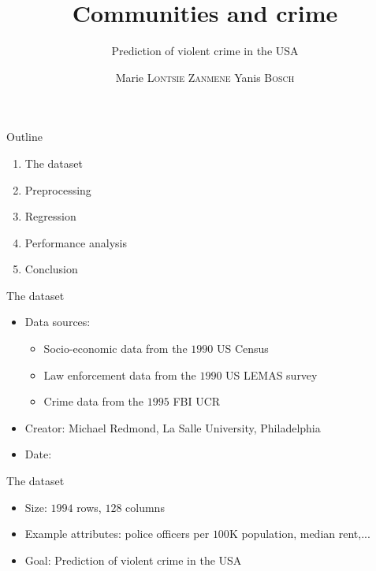 \documentclass{beamer}
\begin{document}
	\begin{frame}
		\title{Communities and crime}
		\subtitle{Prediction of violent crime in the USA}
		\author{Marie \textsc{Lontsie Zanmene} Yanis \textsc{Bosch}}
		\maketitle
	\end{frame}

	\begin{frame}{Outline}
		\begin{enumerate}
			\item The dataset
			\item Preprocessing
			\item Regression
			\item Performance analysis
			\item Conclusion
		\end{enumerate}
	\end{frame}

	\begin{frame}{The dataset}
		\begin{itemize}
			\item Data sources:
				\begin{itemize}
					\item Socio-economic data from the $1990$ US Census
					\item Law enforcement data from the $1990$ US LEMAS survey
					\item Crime data from the $1995$ FBI UCR
				\end{itemize}
			\item Creator: Michael Redmond, La Salle University, Philadelphia
			\item Date: \formatdate{13}{7}{2009}
		\end{itemize}
	\end{frame}

	\begin{frame}{The dataset}
		\begin{itemize}
			\item Size: $1994$ rows, $128$ columns
			\item Example attributes: police officers per $100$K population, median rent,...
			\item Goal: Prediction of violent crime in the USA
		\end{itemize}		
	\end{frame}

	
\end{document}
